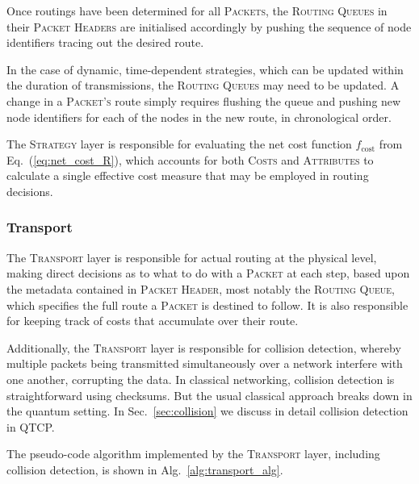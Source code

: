 Once routings have been determined for all \textsc{Packets}, the \textsc{Routing Queues} in their \textsc{Packet Headers} are initialised accordingly by pushing the sequence of node identifiers tracing out the desired route.

In the case of dynamic, time-dependent strategies, which can be updated within the duration of transmissions, the \textsc{Routing Queues} may need to be updated. A change in a \textsc{Packet's} route simply requires flushing the queue and pushing new node identifiers for each of the nodes in the new route, in chronological order.

The \textsc{Strategy} layer is responsible for evaluating the net cost function $f_\mathrm{cost}$ from Eq.~(\ref{eq:net_cost_R}), which accounts for both \textsc{Costs} and \textsc{Attributes} to calculate a single effective cost measure that may be employed in routing decisions.

%
%

\subsubsection{Transport} \label{sec:transport} 

The \textsc{Transport} layer is responsible for actual routing at the physical level, making direct decisions as to what to do with a \textsc{Packet} at each step, based upon the metadata contained in \textsc{Packet Header}, most notably the \textsc{Routing Queue}, which specifies the full route a \textsc{Packet} is destined to follow. It is also responsible for keeping track of costs that accumulate over their route.

Additionally, the \textsc{Transport} layer is responsible for collision detection, whereby multiple packets being transmitted simultaneously over a network interfere with one another, corrupting the data. In classical networking, collision detection is straightforward using checksums. But the usual classical approach breaks down in the quantum setting. In Sec.~\ref{sec:collision} we discuss in detail collision detection in QTCP.

The pseudo-code algorithm implemented by the \textsc{Transport} layer, including collision detection, is shown in Alg.~\ref{alg:transport_alg}.

